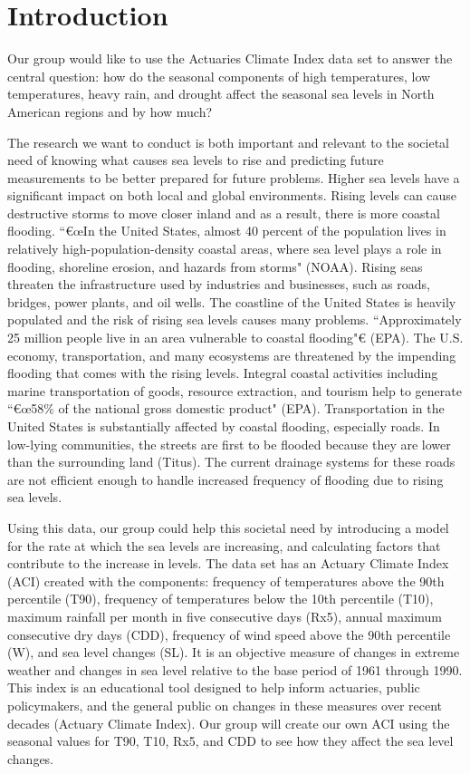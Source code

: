 \documentclass[12pt]{report}
\begin{document}
 \section* {Introduction} 
		
\indent	\par Our group would like to use the Actuaries Climate Index data set to answer the central question: how do the seasonal components of high temperatures, low temperatures, heavy rain, and drought affect the seasonal sea levels in North American regions and by how much?
		\par The research we want to conduct is both important and relevant to the societal need of knowing what causes sea levels to rise and predicting future measurements to be better prepared for future problems. Higher sea levels have a significant impact on both local and global environments. Rising levels can cause destructive storms to move closer inland and as a result, there is more coastal flooding. \textquotedblleft€œIn the United States, almost 40 percent of the population lives in relatively high-population-density coastal areas, where sea level plays a role in flooding, shoreline erosion, and hazards from storms" (NOAA). Rising seas threaten the infrastructure used by industries and businesses, such as roads, bridges, power plants, and oil wells. The coastline of the United States is heavily populated and the risk of rising sea levels causes many problems. \textquotedblleft Approximately 25 million people live in an area vulnerable to coastal flooding"€ (EPA). The U.S. economy, transportation, and many ecosystems are threatened by the impending flooding that comes with the rising levels. Integral coastal activities including marine transportation of goods, resource extraction, and tourism help to generate \textquotedblleft€œ58\% of the national gross domestic product" (EPA). Transportation in the United States is substantially affected by coastal flooding, especially roads. In low-lying communities, the streets are first to be flooded because they are lower than the surrounding land (Titus). The current drainage systems for these roads are not efficient enough to handle increased frequency of flooding due to rising sea levels. 
		\par Using this data, our group could help this societal need by introducing a model for the rate at which the sea levels are increasing, and calculating factors that contribute to the increase in levels. The data set has an Actuary Climate Index (ACI) created with the components: frequency of temperatures above the 90th percentile (T90), frequency of temperatures below the 10th percentile (T10), maximum rainfall per month in five consecutive days (Rx5), annual maximum consecutive dry days (CDD), frequency of wind speed above the 90th percentile (W), and sea level changes (SL). It is an objective measure of changes in extreme weather and changes in sea level relative to the base period of 1961 through 1990. This index is an educational tool designed to help inform actuaries, public policymakers, and the general public on changes in these measures over recent decades (Actuary Climate Index). Our group will create our own ACI using the seasonal values for T90, T10, Rx5, and CDD to see how they affect the sea level changes. 
	
\end{document}
